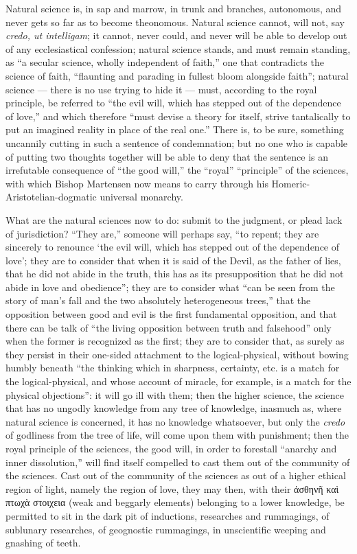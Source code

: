 \documentclass[12pt]{book}
\newcommand{\opage}[1]{\marginnote{\footnotesize\textit{[#1]}}}
\begin{document}
Natural science is, in sap and marrow, in trunk and branches, autonomous, and never gets so far as to become theonomous. Natural science cannot, will not, say \textit{credo, ut intelligam}; it cannot, never could, and never will be able to develop out of any ecclesiastical confession; natural science stands, and must remain standing, as ``a secular science, wholly independent of faith,'' one that contradicts the science of faith, ``flaunting and parading in fullest bloom alongside faith''; natural science --- there is no use trying to hide it --- must, according to the royal principle, be referred to ``the evil will, which has stepped out of the dependence of love,'' and which therefore ``must devise a theory for itself, strive tantalically to put an imagined reality
\opage{15}\setcounter{footnote}{0}%
in place of the real one.'' There is, to be sure, something uncannily cutting in such a sentence of condemnation; but no one who is capable of putting two thoughts together will be able to deny that the sentence is an irrefutable consequence of ``the good will,'' the ``royal'' ``principle'' of the sciences, with which Bishop Martensen now means to carry through his Homeric-Aristotelian-dogmatic universal monarchy.

What are the natural sciences now to do: submit to the judgment, or plead lack of jurisdiction? ``They are,'' someone will perhaps say, ``to repent; they are sincerely to renounce `the evil will, which has stepped out of the dependence of love'; they are to consider that when it is said of the Devil, as the father of lies, that he did not abide in the truth, this has as its presupposition that he did not abide in love and obedience''; they are to consider what ``can be seen from the story of man's fall and the two absolutely heterogeneous trees,'' that the opposition between good and evil is the first fundamental opposition, and that there can be talk of ``the living opposition between truth and falsehood'' only when the former is recognized as the first; they are to consider that, as surely as they persist in their one-sided attachment to the logical-physical, without bowing humbly beneath ``the thinking which in sharpness, certainty, etc. is a match for the logical-physical, and whose account of miracle, for example, is a match for the physical objections'': it will go ill with them; then the higher science, the science that has no ungodly knowledge from any tree of knowledge, inasmuch as, where natural science is concerned, it has no knowledge whatsoever, but only the \textit{credo} of godliness from the tree of life, will come upon them with punishment; then the royal principle of the sciences, the good will, in order to forestall ``anarchy and inner dissolution,'' will find itself compelled to cast them out of the community of the sciences. Cast out of the community of the sciences as out of a higher ethical region of light, namely the region
\opage{16}\setcounter{footnote}{0}%
of love, they may then, with their ἀσθηνῆ καὶ πτωχὰ στοιχεια (weak and beggarly elements) belonging to a lower knowledge, be permitted to sit in the dark pit of inductions, researches and rummagings, of sublunary researches, of geognostic rummagings, in unscientific weeping and gnashing of teeth.
\end{document}
